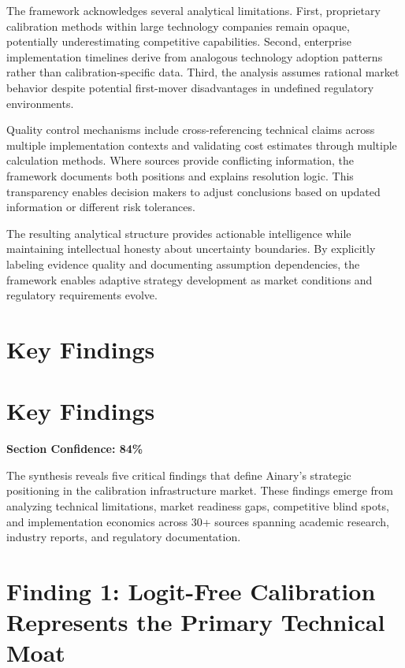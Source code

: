 \documentclass[a4paper,11pt]{article}
\begin{document}
The framework acknowledges several analytical limitations. First, proprietary calibration methods within large technology companies remain opaque, potentially underestimating competitive capabilities. Second, enterprise implementation timelines derive from analogous technology adoption patterns rather than calibration-specific data. Third, the analysis assumes rational market behavior despite potential first-mover disadvantages in undefined regulatory environments.


Quality control mechanisms include cross-referencing technical claims across multiple implementation contexts and validating cost estimates through multiple calculation methods. Where sources provide conflicting information, the framework documents both positions and explains resolution logic. This transparency enables decision makers to adjust conclusions based on updated information or different risk tolerances.


The resulting analytical structure provides actionable intelligence while maintaining intellectual honesty about uncertainty boundaries. By explicitly labeling evidence quality and documenting assumption dependencies, the framework enables adaptive strategy development as market conditions and regulatory requirements evolve.

\clearpage
\section{Key Findings}

\section{Key Findings}

\textbf{Section Confidence: 84\%}\par

The synthesis reveals five critical findings that define Ainary's strategic positioning in the calibration infrastructure market. These findings emerge from analyzing technical limitations, market readiness gaps, competitive blind spots, and implementation economics across 30+ sources spanning academic research, industry reports, and regulatory documentation.


\section{Finding 1: Logit-Free Calibration Represents the Primary Technical Moat}
\end{document}
